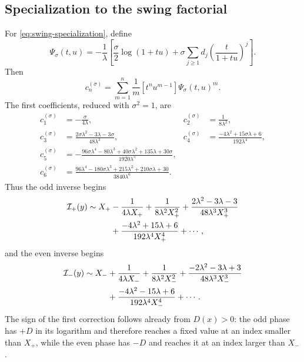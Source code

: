 \documentclass[11pt,a4paper]{article}
\numberwithin{equation}{section}
\theoremstyle{definition}
\theoremstyle{remark}
\begin{document}
\subsection{Specialization to the swing factorial}

For \cref{eq:swing-specialization}, define
\begin{equation}\label{eq:Psi-swing}
 \Psi_\sigma(t,u)=-\frac1\lambda\left[
 \frac\sigma2\log(1+tu)
 +\sigma\sum_{j\ge1}d_j
       \left(\frac{t}{1+tu}\right)^j
 \right].
\end{equation}
Then
\begin{equation}\label{eq:c-swing-master}
 c_n^{(\sigma)}=
 \sum_{m=1}^n\frac1m[t^nu^{m-1}]\Psi_\sigma(t,u)^m.
\end{equation}
The first coefficients, reduced with \(\sigma^2=1\), are
\begin{align}
 c_1^{(\sigma)}&=-\frac{\sigma}{4\lambda},
 &c_2^{(\sigma)}&=\frac1{8\lambda^2},\label{eq:c12}\\
 c_3^{(\sigma)}&=
 \frac{2\sigma\lambda^2-3\lambda-3\sigma}{48\lambda^3},
 &c_4^{(\sigma)}&=
 \frac{-4\lambda^2+15\sigma\lambda+6}{192\lambda^4},
 \label{eq:c34}\\
 c_5^{(\sigma)}&=-\frac{
 96\sigma\lambda^4-80\lambda^3+40\sigma\lambda^2
 +135\lambda+30\sigma}{1920\lambda^5},\label{eq:c5}\\
 c_6^{(\sigma)}&=\frac{
 96\lambda^4-180\sigma\lambda^3+215\lambda^2
 +210\sigma\lambda+30}{3840\lambda^6}.
 \label{eq:c6}
\end{align}
Thus the odd inverse begins
\begin{align}\label{eq:odd-inverse-Lambert}
 \mathcal I_+(y)\sim X_+
 &-\frac{1}{4\lambda X_+}
 +\frac{1}{8\lambda^2X_+^2}
 +\frac{2\lambda^2-3\lambda-3}{48\lambda^3X_+^3}\\
 &+\frac{-4\lambda^2+15\lambda+6}{192\lambda^4X_+^4}
 +\cdots,\notag
\end{align}
and the even inverse begins
\begin{align}\label{eq:even-inverse-Lambert}
 \mathcal I_-(y)\sim X_-
 &+\frac{1}{4\lambda X_-}
 +\frac{1}{8\lambda^2X_-^2}
 +\frac{-2\lambda^2-3\lambda+3}{48\lambda^3X_-^3}\\
 &+\frac{-4\lambda^2-15\lambda+6}{192\lambda^4X_-^4}
 +\cdots.\notag
\end{align}
The sign of the first correction follows already from \(D(x)>0\): the odd
phase has \(+D\) in its logarithm and therefore reaches a fixed value at an
index smaller than \(X_+\), while the even phase has \(-D\) and reaches it
at an index larger than \(X_-\).
\end{document}
